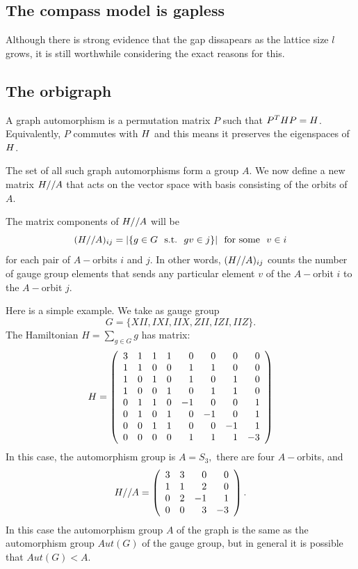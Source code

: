 \documentclass[12pt]{article}
\begin{document}
%

\subsection{The compass model is gapless}

Although there is strong evidence that the gap dissapears as the lattice size
$l$ grows, it is still worthwhile considering the exact reasons for this.

%

\subsection{The orbigraph}

A graph automorphism is a permutation matrix $P$
such that $P^T H P = H$.
Equivalently, $P$ commutes with $H$ and this means it preserves
the eigenspaces of $H$.

\def\auto{A}
\def\smbox#1{\ \ \mbox{#1}\ \ }
The set of all such graph automorphisms 
form a group $\auto$.
We now define a new matrix $\Ham//\auto$
that acts on the vector space with basis consisting
of the orbits of $\auto.$

The matrix components of $\Ham//\auto$ will be
$$
    (\Ham//\auto)_{ij} = |\{ g\in G \smbox{s.t.} gv \in j \}| \smbox{for some}v\in i
$$
for each pair of $\auto-$orbits $i$ and $j$.
In other words, 
$(\Ham//\auto)_{ij} $ counts the number of gauge group
elements that sends any particular element $v$ of the 
$\auto-$orbit $i$ to the $\auto-$orbit $j.$

Here is a simple example. %
We take as gauge group 
$$G = \{XII, IXI, IIX, ZII, IZI, IIZ\}.$$
The Hamiltonian $H = \sum_{g\in G} g$ has matrix:
$$
H = \left(\begin{array}{rrrrrrrr}
 3 &  1 &  1 &  1 &  0 &  0 &  0 &  0 \cr
  1 &  1 &  0 &  0 &  1 &  1 &  0 &  0 \cr
  1 &  0 &  1 &  0 &  1 &  0 &  1 &  0 \cr
  1 &  0 &  0 &  1 &  0 &  1 &  1 &  0 \cr
  0 &  1 &  1 &  0 & -1 &  0 &  0 &  1 \cr
  0 &  1 &  0 &  1 &  0 & -1 &  0 &  1 \cr
  0 &  0 &  1 &  1 &  0 &  0 & -1 &  1 \cr
  0 &  0 &  0 &  0 &  1 &  1 &  1 & -3
\end{array}\right)
$$
In this case, the automorphism group is $\auto=S_3,$
there are four $\auto-$orbits, and
$$
H//\auto = \left(\begin{array}{rrrr}
 3 &  3 &  0 &  0 \cr
  1 &  1 &  2 &  0 \cr
  0 &  2 & -1 &  1 \cr
  0 &  0 &  3 & -3
\end{array}\right).
$$
In this case the automorphism group $\auto$ of the graph
is the same as the automorphism group $Aut(G)$ of the gauge group,
but in general it is possible that $Aut(G) < \auto.$
\end{document}
